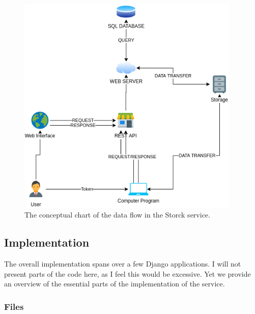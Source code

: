 \begin{figure}[H]
\centering
\includegraphics[width=0.95\textwidth]{figures/chapter5/storck/storck diagram.drawio.png}
\caption{The conceptual chart of the data flow in the Storck service.}
\label{fig:storck_diagram}
\end{figure}

\subsection{Implementation}

The overall implementation spans over a few Django applications. I will not present parts of the code here, as I feel this would be excessive.
Yet we provide an overview of the essential parts of the implementation of the service.

\subsubsection{Files}

